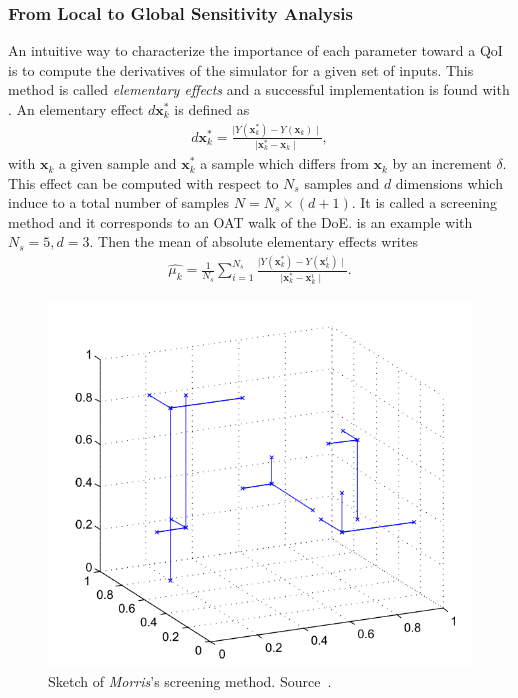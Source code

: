 \subsubsection{From Local to Global Sensitivity Analysis}

An intuitive way to characterize the importance of each parameter toward a QoI is to compute the derivatives of the simulator for a given set of inputs. This method is called \emph{elementary effects} and a successful implementation is found with \citet{morris1991}. An elementary effect $d\mathbf{x}_{k}^*$ is defined as
\begin{align}
d\mathbf{x}_{k}^* = \frac{ \mid Y(\mathbf{x}_{k}^*) -  Y(\mathbf{x}_{k}) \mid}{\mid \mathbf{x}_{k}^* - \mathbf{x}_{k}  \mid},
\end{align}
\noindent with $\mathbf{x}_{k}$ a given sample and $\mathbf{x}_{k}^*$ a sample which differs from $\mathbf{x}_{k}$ by an increment $\delta$. This effect can be computed with respect to $N_s$ samples and $d$ dimensions which induce to a total number of samples $N = N_s\times(d + 1)$. It is called a screening method and it corresponds to an OAT walk of the DoE.  is an example with $N_s = 5, d = 3$. Then the mean of absolute elementary effects writes
\begin{align}
\hat{\mu_k} = \frac{1}{N_s} \sum_{i=1}^{N_s} \frac{ \mid Y(\mathbf{x}_{k}^*) -  Y(\mathbf{x}_{k}^i) \mid}{\mid \mathbf{x}_{k}^* - \mathbf{x}_{k}^i  \mid}.
\end{align}

\begin{figure}[!h]
\centering
\includegraphics[width=0.8\linewidth,keepaspectratio]{fig/literature/morris.png}
\caption{Sketch of \emph{Morris}'s screening method. Source~\cite{Becker2018}.}
\label{fig:morris}
\end{figure}

